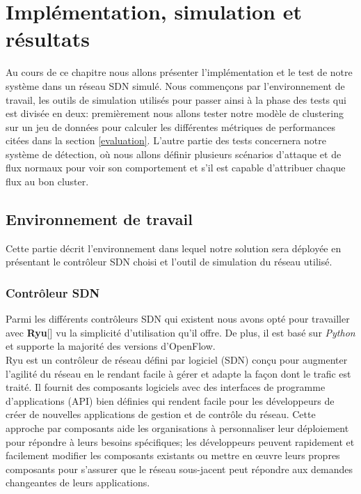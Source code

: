 \chapter{Implémentation, simulation et résultats}

\label{Chapter5}
Au cours de ce chapitre nous allons présenter l'implémentation et le test de notre système dans un réseau SDN simulé. Nous commençons par l'environnement de travail, les outils de simulation utilisés pour passer ainsi à la phase des tests qui est divisée en deux: premièrement nous allons tester notre modèle de clustering sur un jeu de données pour calculer les différentes métriques de performances citées dans la section \ref{evaluation}. L'autre partie des tests concernera notre système de détection, où nous allons définir plusieurs scénarios d'attaque et de flux normaux pour voir son comportement et s'il est capable d'attribuer chaque flux au bon cluster. 


\section{Environnement de travail}
Cette partie décrit l'environnement dans lequel notre solution sera déployée en présentant le contrôleur SDN choisi et l'outil de simulation du réseau utilisé.

\subsection{Contrôleur SDN}
Parmi les différents contrôleurs SDN qui existent nous avons opté pour travailler avec \textbf{Ryu}[\cite{4}] vu la simplicité d'utilisation qu'il offre. De plus, il est basé sur \textit{Python} et supporte la majorité des versions d’OpenFlow.\\

\noindent Ryu est un contrôleur de réseau défini par logiciel (SDN) conçu pour augmenter l’agilité du réseau en le rendant facile à gérer et adapte la façon dont le trafic est traité. Il fournit des composants logiciels avec des interfaces de programme d'applications (API) bien définies qui rendent facile pour les développeurs de créer de nouvelles applications de gestion et de contrôle du réseau. Cette approche par composants aide les organisations à personnaliser leur déploiement pour répondre à leurs besoins spécifiques; les développeurs peuvent rapidement et facilement modifier les composants existants ou mettre en œuvre leurs propres composants pour s’assurer que le réseau sous-jacent peut répondre aux demandes changeantes de leurs applications.\\

